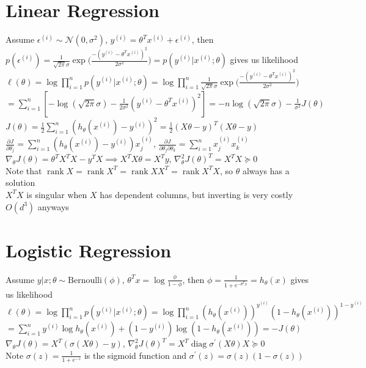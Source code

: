 \documentclass{article}
\newcommand{\N}{\mathcal{N}}
\DeclareMathOperator{\rank}{rank}
\DeclareMathOperator{\diag}{diag}
\begin{document}
\section{Linear Regression}
Assume $\epsilon^{(i)} \sim \N(0, \sigma^2)$, $y^{(i)} = \theta^Tx^{(i)} + \epsilon^{(i)}$, then \\
$p(\epsilon^{(i)}) = \frac{1}{\sqrt{2 \pi} \sigma} \exp \big ({\frac{-(y^{(i)} - \theta^T x^{(i)})^2}{2\sigma^2}} \big) = p(y^{(i)} | x^{(i)} ; \theta)$ gives us likelihood \\
$\ell(\theta) = \log \prod\limits_{i=1}^n p(y^{(i)} | x^{(i)} ; \theta) = \log \prod\limits_{i=1}^n \frac{1}{\sqrt{2 \pi} \sigma} \exp \big ({\frac{-(y^{(i)} - \theta^T x^{(i)})^2}{2\sigma^2}} \big) $ \\
\hspace*{0.577cm} $ = \sum\limits_{i=1}^n [-\log(\sqrt{2\pi}\sigma) - \frac{1}{2\sigma^2} (y^{(i)} - \theta^T x^{(i)})^2] = -n\log(\sqrt{2\pi}\sigma) - \frac{1}{\sigma^2} J(\theta) $ \\
$J(\theta) = \frac{1}{2} \sum\limits_{i=1}^n (h_\theta(x^{(i)}) - y^{(i)})^2 = \frac{1}{2} (X\theta - y)^T(X\theta - y)$ \\
$\frac{\partial J}{\partial \theta_j} = \sum\limits_{i=1}^n (h_\theta(x^{(i)}) - y^{(i)})x_j^{(i)}$, $\frac{\partial J}{\partial \theta_j \partial\theta_k} = \sum\limits_{i=1}^n x_j^{(i)}x_k^{(i)}$ \\
$\nabla_\theta J(\theta) = \theta^TX^TX - y^TX \implies X^TX\theta = X^Ty$, $\nabla_\theta^2 J(\theta)^T = X^TX \succeq 0$ \\
Note that $\rank X = \rank X^T = \rank XX^T = \rank X^TX $, so $\theta$ always has a solution \\
$X^TX$ is singular when $X$ has dependent columns, but inverting is very costly $O(d^3)$ anyways

\section{Logistic Regression}
Assume $y|x ; \theta \sim \mbox{Bernoulli}(\phi)$, $\theta^T x = \log \frac{\phi}{1-\phi}$, then $\phi = \frac{1}{1+e^{-\theta^T x}} = h_\theta(x)$ gives us likelihood \\
$\ell(\theta) =\log \prod\limits_{i=1}^n p(y^{(i)} | x^{(i)} ; \theta) = \log \prod\limits_{i=1}^n (h_\theta(x^{(i)}))^{y^{(i)}}(1-h_\theta(x^{(i)}))^{1-y^{(i)}}$ \\
\hspace*{0.577cm} $ = \sum\limits_{i=1}^n y^{(i)}\log h_\theta(x^{(i)}) + (1-y^{(i)})\log (1-h_\theta(x^{(i)})) = - J(\theta)$ \\
$\nabla_\theta J(\theta) = X^T (\sigma(X\theta) - y)$, $\nabla_\theta^2 J(\theta)^T =  X^T \diag \sigma^\prime (X\theta)X \succeq 0$ \\
Note $\sigma(z) = \frac{1}{1+e^{-z}}$ is the sigmoid function and $\sigma^\prime(z) = \sigma(z)(1-\sigma(z))$
\end{document}
